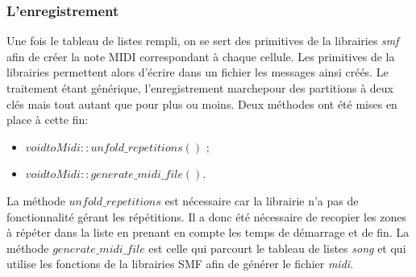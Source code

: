 \subsubsection{L'enregistrement}
Une fois le tableau de listes rempli, on se sert des primitives de la librairies \textit{smf} afin de créer la note MIDI correspondant à chaque cellule. Les primitives de la librairies permettent alors d'écrire dans un fichier les messages ainsi créés. Le traitement étant générique, l'enregistrement marchepour des partitions à deux clés mais tout autant que pour plus ou moins. Deux méthodes ont été mises en place à cette fin:
\begin{itemize}
\item $void toMidi::unfold\_ repetitions()$ ;
\item $void toMidi::generate\_ midi\_ file()$.
\end{itemize}
La méthode $unfold\_ repetitions$ est nécessaire car la librairie n'a pas de fonctionnalité gérant les répétitions. Il a donc été nécessaire de recopier les zones à répéter dans la liste en prenant en compte les temps de démarrage et de fin. 
La méthode $generate\_ midi\_ file$ est celle qui parcourt le tableau de listes \textit{song} et qui utilise les fonctions de la librairies SMF afin de générer le fichier \textit{midi}.

